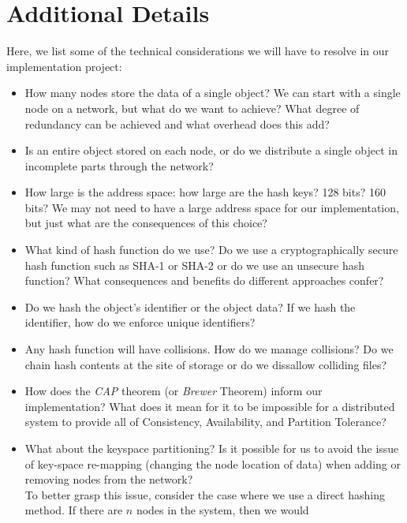 \documentclass[12pt]{report}
\begin{document}
    \section{Additional Details}
    Here, we list some of the technical considerations we will have to resolve
    in our implementation project:
    \begin{itemize}
        \item How many nodes store the data of a single object?  We can start
            with a single node on a network, but what do we want to achieve?
            What degree of redundancy can be achieved and what overhead does
            this add?
        \item Is an entire object stored on each node, or do we distribute a
            single object in incomplete parts through the network?
        \item How large is the address space: how large are the hash keys?  128
            bits?  160 bits?  We may not need to have a large address space for
            our implementation, but just what are the consequences of this
            choice?
        \item What kind of hash function do we use?  Do we use a
            cryptographically secure hash function such as SHA-1 or SHA-2 or do
            we use an unsecure hash function?  What consequences and benefits do
            different approaches confer?
        \item Do we hash the object's identifier or the object data?  If we hash
            the identifier, how do we enforce unique identifiers?
        \item Any hash function will have collisions.  How do we manage
            collisions?  Do we chain hash contents at the site of storage or do
            we dissallow colliding files?
        \item How does the \textit{CAP} theorem (or \textit{Brewer} Theorem)
            inform our implementation? What does it mean for it to be impossible
            for a distributed system to provide all of Consistency,
            Availability, and Partition Tolerance?
        \item What about the keyspace partitioning?  Is it possible for us to
            avoid the issue of key-space re-mapping (changing the node location
            of data) when adding or removing nodes from the network?\\
            To better grasp this issue, consider the case where we use a direct
            hashing method.  If there are $n$ nodes in the system, then we would

\end{itemize}
\end{document}
